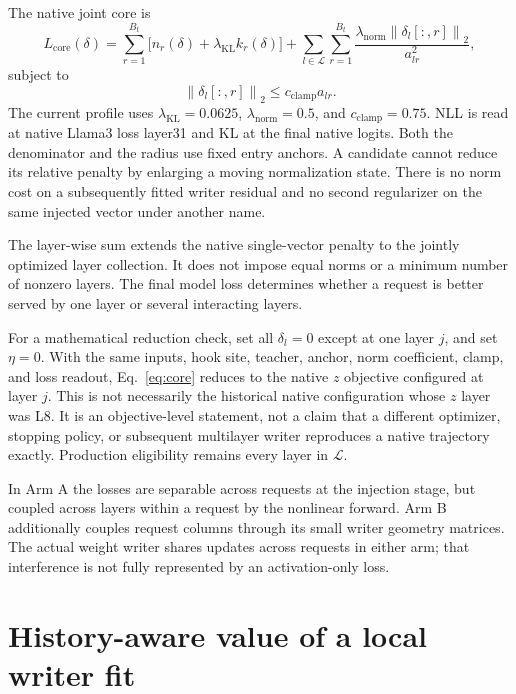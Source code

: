\documentclass[11pt]{article}
\newcommand{\Lset}{\mathcal L}
\newcommand{\norm}[1]{\left\lVert#1\right\rVert}
\begin{document}
The native joint core is
\begin{equation}
 L_{\mathrm{core}}(\delta)
 =\sum_{r=1}^{B_t}\bigl[n_r(\delta)+\lambda_{\mathrm{KL}}k_r(\delta)\bigr]
   +\sum_{l\in\Lset}\sum_{r=1}^{B_t}
      \frac{\lambda_{\mathrm{norm}}\norm{\delta_l[:,r]}_2}{a_{lr}^2},
 \label{eq:core}
\end{equation}
subject to
\begin{equation}
 \norm{\delta_l[:,r]}_2\leq c_{\mathrm{clamp}}a_{lr}.
 \label{eq:clamp}
\end{equation}
The current profile uses $\lambda_{\mathrm{KL}}=0.0625$,
$\lambda_{\mathrm{norm}}=0.5$, and $c_{\mathrm{clamp}}=0.75$. NLL is
read at native Llama3 loss layer31 and KL at the final native logits.
Both the denominator and the radius use fixed entry anchors. A candidate
cannot reduce its relative penalty by enlarging a moving normalization
state. There is no norm cost on a subsequently fitted writer residual and
no second regularizer on the same injected vector under another name.

The layer-wise sum extends the native single-vector penalty to the jointly
optimized layer collection. It does not impose equal norms or a minimum
number of nonzero layers. The final model loss determines whether a
request is better served by one layer or several interacting layers.

For a mathematical reduction check, set all $\delta_l=0$ except at one
layer $j$, and set $\eta=0$. With the same inputs, hook site, teacher,
anchor, norm coefficient, clamp, and loss readout, Eq.~\eqref{eq:core}
reduces to the native $z$ objective configured at layer $j$. This is not
necessarily the historical native configuration whose $z$ layer was L8.
It is an objective-level statement, not a claim that a different optimizer,
stopping policy, or subsequent multilayer writer reproduces a native
trajectory exactly. Production eligibility remains every layer in $\Lset$.

In Arm A the losses are separable across requests at the injection stage,
but coupled across layers within a request by the nonlinear forward.
Arm B additionally couples request columns through its small writer
geometry matrices. The actual weight writer shares updates across requests
in either arm; that interference is not fully represented by an
activation-only loss.

\clearpage
\section{History-aware value of a local writer fit}
\end{document}
